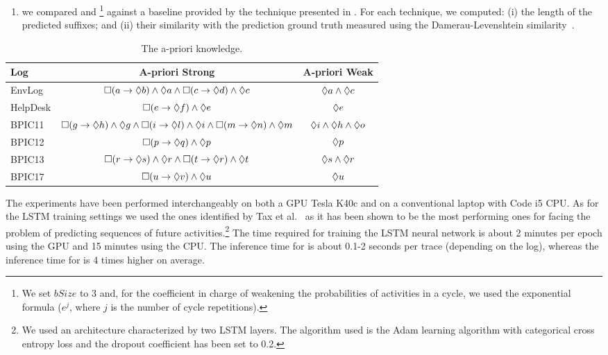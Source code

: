 \begin{enumerate}
\item  we compared \nocycle and \protrack \footnote{We set $bSize$ to $3$ and, for the coefficient in charge of weakening the probabilities of activities in a cycle, we used the exponential formula ($e^{j}$, where $j$ is the number of cycle repetitions).} against a baseline provided by the technique presented in \cite{niek96732}. For each technique, we computed: (i) the length of the predicted suffixes; and (ii) their similarity with the prediction ground truth measured using the Damerau-Levenshtein similarity~\cite{Damerau:1964:TCD:363958.363994}.
\end{enumerate}
\begin{table}[t!]
	\centering	
	\begin{scriptsize}
	\begin{tabular}{l|c|c}
		\toprule
		\textbf{Log}  & \textbf{A-priori Strong} & \textbf{A-priori Weak} \\
		\midrule
		EnvLog     & $\square(a \rightarrow \lozenge b) \wedge \lozenge a \wedge \square(c \rightarrow \lozenge d) \wedge \lozenge c$  & $\lozenge a \wedge \lozenge c$ \\
		HelpDesk   & $\square(e \rightarrow \lozenge f) \wedge \lozenge e$ & $\lozenge e$\\
		BPIC11      & $\square(g \rightarrow \lozenge h) \wedge \lozenge g \wedge \square(i \rightarrow \lozenge l) \wedge \lozenge i \wedge \square(m \rightarrow \lozenge n) \wedge \lozenge m$ &
		$\lozenge i \wedge \lozenge h \wedge \lozenge o$		\\
		BPIC12      & $\square(p \rightarrow \lozenge q) \wedge \lozenge p$ & $\lozenge p$   \\
		BPIC13      & $\square(r \rightarrow \lozenge s) \wedge \lozenge r \wedge \square(t \rightarrow \lozenge r) \wedge \lozenge t$ & $\lozenge s \wedge \lozenge r$ \\
		BPIC17      & $\square(u \rightarrow \lozenge v) \wedge \lozenge u$  & $\lozenge u$  \\
		\bottomrule
	\end{tabular}
	\end{scriptsize}
	\caption{The a-priori knowledge.}
	\label{table:apriori}
\end{table}
The experiments have been performed interchangeably on both a GPU Tesla K40c and on a conventional laptop with Code i5 CPU. As for the LSTM training settings we used the ones identified by Tax et al.~\cite{niek96732} as it has been shown to be the most performing ones for facing the problem of predicting sequences of future activities.\footnote{We used an architecture characterized by two LSTM layers. The algorithm used is the Adam learning algorithm with categorical cross entropy loss and the dropout coefficient has been set to 0.2.} The time required for training the LSTM neural network is about 2 minutes per epoch using the GPU and 15 minutes using the CPU. The inference time for \nocycle %
 is about 0.1-2 seconds per trace (depending on the log), whereas the inference time for \protrack is 4 times higher on average.


